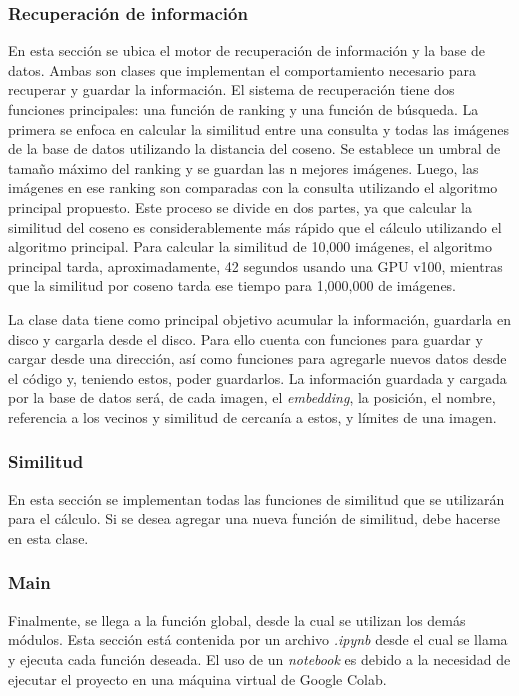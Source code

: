 \subsubsection{Recuperaci\'on de informaci\'on}
En esta sección se ubica el motor de recuperación de información y la base de datos. Ambas son clases que implementan el comportamiento necesario para recuperar y guardar la información. El sistema de recuperación tiene dos funciones principales: una función de ranking y una función de búsqueda. La primera se enfoca en calcular la similitud entre una consulta y todas las im\'agenes de la base de datos utilizando la distancia del coseno. Se establece un umbral de tamaño m\'aximo del ranking y se guardan las n mejores im\'agenes. Luego, las im\'agenes en ese ranking son comparadas con la consulta utilizando el algoritmo principal propuesto. Este proceso se divide en dos partes, ya que calcular la similitud del coseno es considerablemente m\'as r\'apido que el c\'alculo utilizando el algoritmo principal. Para calcular la similitud de 10,000 im\'agenes, el algoritmo principal tarda, aproximadamente, 42 segundos usando una GPU v100, mientras que la similitud por coseno tarda ese tiempo para 1,000,000 de im\'agenes.

La clase data tiene como principal objetivo acumular la información, guardarla en disco y cargarla desde el disco. Para ello cuenta con funciones para guardar y cargar desde una dirección, así como funciones para agregarle nuevos datos desde el código y, teniendo estos, poder guardarlos. La información guardada y cargada por la base de datos ser\'a, de cada imagen, el \textit{embedding}, la posición, el nombre, referencia a los vecinos y similitud de cercanía a estos, y límites de una imagen.

\subsubsection{Similitud}
En esta sección se implementan todas las funciones de similitud que se utilizar\'an para el c\'alculo. Si se desea agregar una nueva función de similitud, debe hacerse en esta clase.

\subsubsection{Main} 
Finalmente, se llega a la función global, desde la cual se utilizan los dem\'as módulos. Esta sección est\'a contenida por un archivo \textit{.ipynb} desde el cual se llama y ejecuta cada función deseada. El uso de un \textit{notebook} es debido a la necesidad de ejecutar el proyecto en una m\'aquina virtual de Google Colab.


